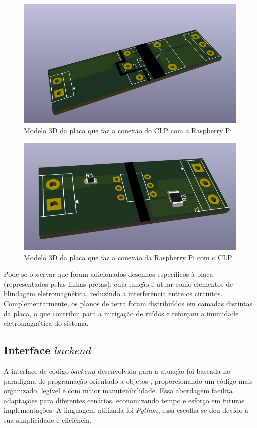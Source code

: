\documentclass{ecatfg}
\begin{document}
\begin{figure}[!htb]
    \centering
    \includegraphics[scale=0.15]{Figuras/placa_clp_rele.png}
    \caption{Modelo 3D da placa que faz a conexão do CLP com a Raspberry Pi}
    \label{fig:clp_rasp_board}
\end{figure}

\begin{figure}[!htb]
    \centering
    \includegraphics[scale=0.15]{Figuras/placa_rasp_clp.png}
    \caption{Modelo 3D da placa que faz a conexão da Raspberry Pi com o CLP}
    \label{fig:rasp_clp_board}
\end{figure}

Pode-se observar que foram adicionados desenhos específicos à placa (representados pelas linhas pretas), cuja função é atuar como elementos de blindagem eletromagnética, reduzindo a interferência entre os circuitos. Complementarmente, os planos de terra foram distribuídos em camadas distintas da placa, o que contribui para a mitigação de ruídos e reforçam a imunidade eletromagnética do sistema.\par

\subsection{Interface $backend$}
A interface de código $backend$ desenvolvida para a atuação foi baseada no paradigma de programação orientado a objetos \cite{oop}, proporcionando um código mais organizado, legível e com maior manutenibilidade. Essa abordagem facilita adaptações para diferentes cenários, economizando tempo e esforço em futuras implementações. A linguagem utilizada foi $Python$, essa escolha se deu devido a sua simplicidade e eficiência.\par
\end{document}
